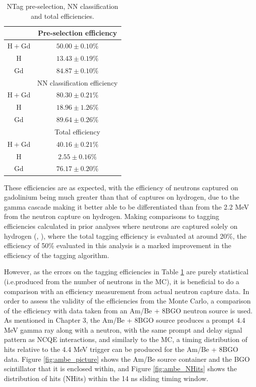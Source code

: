 \begin{table}
    \centering
    \begin{tabular}{||c|c||}
        \hline & Pre-selection efficiency \\
        \hline $\mathrm{H}+\mathrm{Gd}$ & $50.00 \pm 0.10 \%$ \\
        \hline $\mathrm{H}$ & $13.43 \pm 0.19 \%$ \\
        \hline $\mathrm{Gd}$ & $84.87 \pm 0.10 \%$ \\
        \hline
        \hline & NN classification efficiency \\
        \hline $\mathrm{H}+\mathrm{Gd}$ & $80.30 \pm 0.21 \%$ \\
        \hline $\mathrm{H}$ & $18.96 \pm 1.26 \%$ \\
        \hline $\mathrm{Gd}$ & $89.64 \pm 0.26 \%$ \\
        \hline
        \hline & Total efficiency \\
        \hline $\mathrm{H}+\mathrm{Gd}$ & $40.16 \pm 0.21 \%$ \\
        \hline $\mathrm{H}$ & $2.55 \pm 0.16 \%$ \\
        \hline $\mathrm{Gd}$ & $76.17 \pm 0.20 \%$ \\
        \hline
        \end{tabular}
    \caption{NTag pre-selection, NN classification and total efficiencies.}
    \label{table:NTag_efficiency}
\end{table}

These efficiencies are as expected, with the efficiency of neutrons captured on gadolinium being much greater than that of captures on hydrogen, due to the gamma cascade making it better able to be differentiated than from the 2.2 MeV from the neutron capture on hydrogen. Making comparisons to tagging efficiencies calculated in prior analyses where neutrons are captured solely on hydrogen (\cite{tn415_fiacob}, \cite{tn_374}), where the total tagging efficiency is evaluated at around 20\%, the efficiency of 50\% evaluated in this analysis is a marked improvement in the efficiency of the tagging algorithm. 


However, as the errors on the tagging efficiencies in Table \ref{table:NTag_efficiency} are purely statistical (i.e.produced from the number of neutrons in the MC), it is beneficial to do a comparison with an efficiency measurement from actual neutron capture data. In order to assess the validity of the efficiencies from the Monte Carlo, a comparison of the efficiency with data taken from an Am/Be + 8BGO neutron source is used. As mentioned in Chapter 3, the Am/Be + 8BGO source produces a prompt 4.4 MeV gamma ray along with a neutron, with the same prompt and delay signal pattern as NCQE interactions, and similarly to the MC, a timing distribution of hits relative to the 4.4 MeV trigger can be produced for the Am/Be + 8BGO data. Figure \ref{fig:ambe_picture} shows the Am/Be source container and the BGO scintillator that it is enclosed within, and Figure \ref{fig:ambe_NHits} shows the distribution of hits (NHits) within the 14 ns sliding timing window. 




